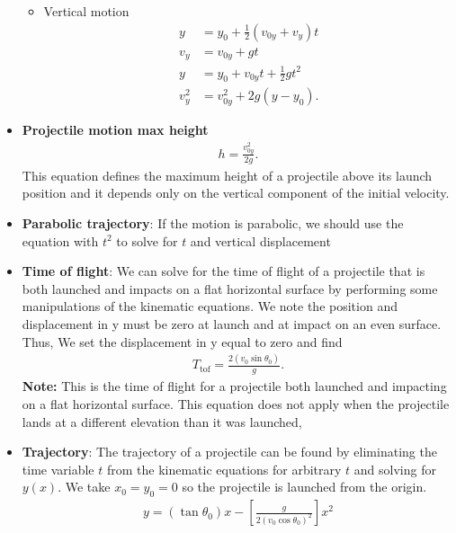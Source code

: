 \documentclass{report}
\begin{document}
\begin{itemize}
\begin{itemize}
                    \item Vertical motion
                        \begin{align*}
                            y &= y_{0} + \frac{1}{2}(v_{0y} + v_{y})t \\
                            v_{y}&= v_{0y} + gt \\
                            y &=y_{0}+v_{0y}t + \frac{1}{2}gt^{2} \\
                            v^{2}_{y} &= v_{0y}^{2}+2g(y-y_{0})
                        .\end{align*}
                \end{itemize}
            \item \textbf{Projectile motion max height}
                \begin{align*}
                    h = \frac{v_{0y}^{2}}{2g}
                .\end{align*}
                This equation defines the maximum height of a projectile above its launch position and it depends only on the vertical component of the initial velocity.
            \item \textbf{Parabolic trajectory}: If the motion is parabolic, we should use the equation with $t^{2}$ to solve for $t$ and vertical displacement
            \item \textbf{Time of flight}: We can solve for the time of flight of a projectile that is both launched and impacts on a flat horizontal surface by performing some manipulations of the kinematic equations. We note the position and displacement in y must be zero at launch and at impact on an even surface. Thus, We set the displacement in y equal to zero and find
                \begin{align*}
                    T_{\text{tof}} = \frac{2(v_{0}\sin{\theta_{0}})}{g}
                .\end{align*}
                \textbf{Note:} This is the time of flight for a projectile both launched and impacting on a flat horizontal surface. This equation does not apply when the projectile lands at a different elevation than it was launched,
            \item \textbf{Trajectory}: The trajectory of a projectile can be found by eliminating the time variable $t$ from the kinematic equations for arbitrary $t$ and solving for $y(x)$. We take $x_{0} = y_{0} = 0$ so the projectile is launched from the origin. 
                \begin{align*}
                    y = (\tan{\theta_{0}})x - \left[\frac{g}{2(v_{0}\cos{\theta_{0}})^{2}}\right]x^{2}

\end{align*}
\end{itemize}
\end{document}
